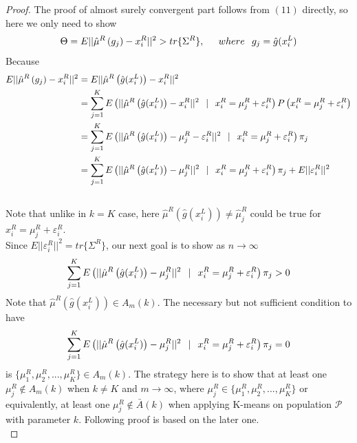 \documentclass[11pt]{article}
\begin{document}
\begin{proof}
The proof of almost surely convergent part follows from $(11)$ directly, so here we only need to show 
\[\Theta = E||\hat{\mu}^R \left(g_j\right) - x^R_i||^2 > tr\{\Sigma^R\}, \hspace{0.2in} where \hspace{0.1in}g_j=\hat{g}(x^L_i) \]
Because 
\begin{align} \nonumber
  E||\hat{\mu}^R \left(g_j\right) - x^R_i||^2  &=  E||\hat{\mu}^R \left(\hat{g}(x^L_i)\right) - x^R_i||^2 \\ \nonumber
  & = \sum^K_{j=1}E\left(||\hat{\mu}^R \left(\hat{g}(x^L_i)\right) - x^R_i||^2  \hspace{0.1 in}| \hspace{0.1 in} x^R_i = \mu^R_{j} + \varepsilon^R_i\right) P\left(x^R_i = \mu^R_{j} + \varepsilon^R_i\right)\\ \nonumber
  &= \sum^K_{j=1}E\left(||\hat{\mu}^R \left(\hat{g}(x^L_i)\right) - \mu^R_{j} - \varepsilon^R_i||^2\hspace{0.1 in}| \hspace{0.1 in} x^R_i = \mu^R_{j} + \varepsilon^R_i \right)\pi_j\\ \nonumber
  &=  \sum^K_{j=1}E\left(||\hat{\mu}^R \left(\hat{g}(x^L_i)\right) - \mu^R_{j}||^2\hspace{0.1 in}| \hspace{0.1 in} x^R_i = \mu^R_{j} + \varepsilon^R_i \right)\pi_j + E||\varepsilon^R_i||^2\\ \nonumber
\end{align}
Note that unlike in $k = K$ case, here $\hat{\mu}^R \left(\hat{g}(x^L_i)\right) \neq \hat{\mu}^R_j$ could be true for $x^R_i = \mu^R_j+\varepsilon^R_i$.\\

Since $E||\varepsilon^R_i||^2 = tr\{\Sigma^R\}$, our next goal is to show as $n \to \infty$
\begin{equation}
\sum^K_{j=1}E\left(||\hat{\mu}^R \left(\hat{g}(x^L_i)\right) - \mu^R_{j}||^2\hspace{0.1 in}| \hspace{0.1 in} x^R_i = \mu^R_{j} + \varepsilon^R_i \right)\pi_j > 0
\end{equation}
Note that $\hat{\mu}^R \left(\hat{g}(x^L_i)\right) \in A_m(k)$. The necessary but not sufficient condition to have  
\[\sum^K_{j=1}E\left(||\hat{\mu}^R \left(\hat{g}(x^L_i)\right) - \mu^R_{j}||^2\hspace{0.1 in}| \hspace{0.1 in} x^R_i = \mu^R_{j} + \varepsilon^R_i \right)\pi_j = 0\]
is $\{\mu^R_1,\mu^R_2,...,\mu^R_K\} \in A_m(k)$. The strategy here is to show that at least one $\mu^R_j \notin A_m(k)$ when $k\neq K$ and $m \to \infty$, where $\mu^R_j \in \{\mu^R_1,\mu^R_2,...,\mu^R_K\}$ or equivalently, at least one $\mu^R_j \notin \bar{A}(k)$ when applying K-means on population $\mathcal{P}$ with parameter $k$. Following proof is based on the later one. \\


\end{proof}
\end{document}
